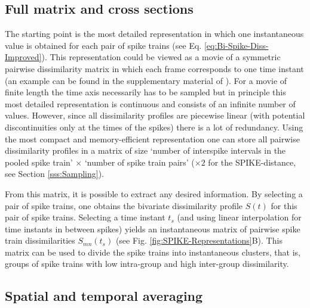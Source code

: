 \documentclass[10pt,twocolumn]{elsart5p}
\begin{document}
%

\subsection{\label{ss:Full-matrix-and-cross-sections} Full matrix and cross sections}

The starting point is the most detailed representation in which one instantaneous value is obtained for each pair of spike trains (see Eq. \ref{eq:Bi-Spike-Diss-Improved}). This representation could be viewed as a movie of a symmetric pairwise dissimilarity matrix in which each frame corresponds to one time instant (an example can be found in the supplementary material of \citep{Kreuz13}). For a movie of finite length the time axis necessarily has to be sampled but in principle this most detailed representation is continuous and consists of an infinite number of values. However, since all dissimilarity profiles are piecewise linear (with potential discontinuities only at the times of the spikes) there is a lot of redundancy. Using the most compact and memory-efficient representation one can store all pairwise dissimilarity profiles in a matrix of size `number of interspike intervals in the pooled spike train' $\times$ `number of spike train pairs' ($\times 2$ for the SPIKE-distance, see Section \ref{sss:Sampling}).

From this matrix, it is possible to extract any desired information. By selecting a pair of spike trains, one obtains the bivariate dissimilarity profile $S (t)$ for this pair of spike trains. Selecting a time instant $t_s$ (and using linear interpolation for time instants in between spikes) yields an instantaneous matrix of pairwise spike train dissimilarities $S_{mn}(t_s)$ (see Fig. \ref{fig:SPIKE-Representations}B). This matrix can be used to divide the spike trains into instantaneous clusters, that is, groups of spike trains with low intra-group and high inter-group dissimilarity.

\subsection{\label{ss:Spatial-and-temporal-Averaging} Spatial and temporal averaging}
\end{document}
